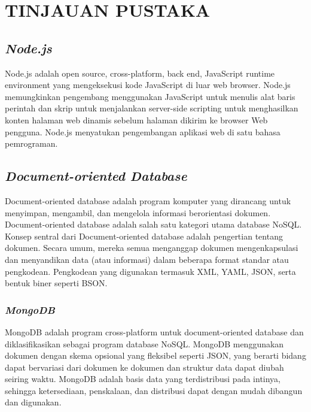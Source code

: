\chapter{TINJAUAN PUSTAKA}
\vspace{4ex}

\setlength{\parindent}{7ex}


\section{\emph{Node.js}}
\vspace{1ex}
Node.js adalah open source, cross-platform, back end, JavaScript runtime environment yang mengeksekusi kode 
JavaScript di luar web browser. 
Node.js memungkinkan pengembang menggunakan JavaScript untuk menulis alat baris 
perintah dan skrip untuk menjalankan server-side scripting untuk menghasilkan konten halaman web dinamis sebelum
halaman dikirim ke browser Web pengguna. 
Node.js menyatukan pengembangan aplikasi web di satu bahasa pemrograman.
\vspace{0.5ex}

\section{\emph{Document-oriented Database}}
\vspace{1ex}
Document-oriented database adalah program komputer yang dirancang untuk menyimpan, mengambil, dan mengelola 
informasi berorientasi dokumen.
Document-oriented database adalah salah satu kategori utama database NoSQL. 
Konsep sentral dari Document-oriented database adalah pengertian tentang dokumen. Secara umum, 
mereka semua menganggap dokumen mengenkapsulasi dan menyandikan data (atau informasi) dalam beberapa format 
standar atau pengkodean. Pengkodean yang digunakan termasuk XML, YAML, JSON, serta bentuk biner seperti BSON.
\vspace{0.5ex}

\subsection{\emph{MongoDB}}
\vspace{1ex}
MongoDB adalah program cross-platform untuk document-oriented database dan diklasifikasikan sebagai program database 
NoSQL. MongoDB menggunakan dokumen dengan skema opsional yang fleksibel seperti JSON, yang berarti bidang dapat 
bervariasi dari dokumen ke dokumen dan struktur data dapat diubah seiring waktu. MongoDB adalah basis data yang 
terdistribusi pada intinya, sehingga ketersediaan, penskalaan, dan distribusi dapat dengan mudah 
dibangun dan digunakan.
\vspace{0.5ex}

